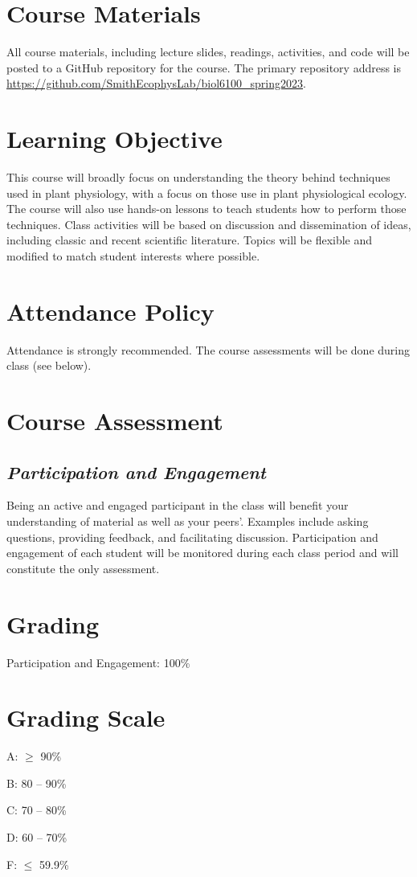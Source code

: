 \documentclass[12pt, notitlepage]{article}   	%
\begin{document}
{\section{Course Materials}
All course materials, including lecture slides, readings, activities, and code 
will be posted to a GitHub repository for the course.
The primary repository address is
\url{https://github.com/SmithEcophysLab/biol6100_spring2023}.

\section{Learning Objective}
This course will broadly focus on understanding the theory behind techniques
used in plant physiology, with a focus on those use in plant physiological ecology. 
The course will also use hands-on lessons to teach students how to perform those
techniques.
Class activities will be based on discussion and dissemination of ideas, 
including classic and recent scientific literature. 
Topics will be flexible and modified to match student interests where possible.

\section{Attendance Policy}
Attendance is strongly recommended. 
The course assessments will be done during class (see below).

\section{Course Assessment}
\subsection{\textit{Participation and Engagement}}
Being an active and engaged participant in the class will benefit your understanding
of material as well as your peers'. Examples include asking questions, providing feedback,
and facilitating discussion. Participation and engagement of each student will be monitored
during each class period and will constitute the only assessment.

\section{Grading}
Participation and Engagement: 100\% \par

\section{Grading Scale}
A: $\geq$ 90\% \par
B: 80 – 90\% \par
C: 70 – 80\% \par
D: 60 – 70\% \par
F: $\leq$ 59.9\% \par

}
\end{document}
